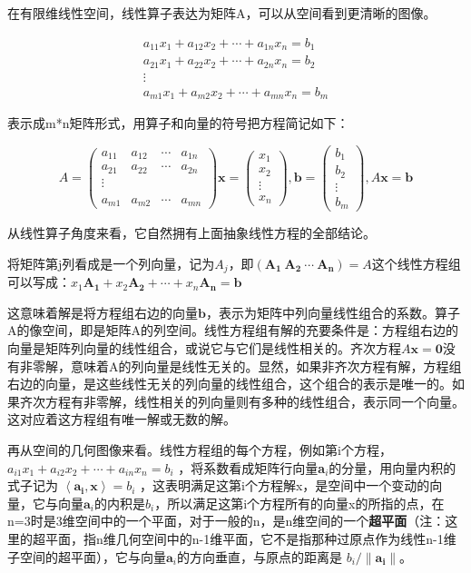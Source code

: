 在有限维线性空间，线性算子表达为矩阵A，可以从空间看到更清晰的图像。

\[\begin{matrix} a_{11}x_1+a_{12}x_2+\cdots+a_{1n}x_n=b_1 \\ a_{21}x_1+a_{22}x_2+\cdots+a_{2n}x_n=b_2 \\ \vdots\\  a_{m1}x_1+a_{m2}x_2+\cdots +a_{mn}x_n=b_m\end{matrix}\]

表示成m*n矩阵形式，用算子和向量的符号把方程简记如下：

\[A=\begin{pmatrix}a_{11}& a_{12}&\cdots& a_{1n} \\ a_{21}& a_{22}&\cdots& a_{2n} \\ \vdots\\ \\a_{m1}& a_{m2} &\cdots& a_{mn}  \end{pmatrix} \textbf{x}= \begin{pmatrix}x_1 \\x_2 \\ \vdots \\x_n \end{pmatrix},  \textbf{b}= \begin{pmatrix}b_1 \\b_2 \\ \vdots \\b_m \end{pmatrix},A\textbf{x}=\textbf{b}\]

从线性算子角度来看，它自然拥有上面抽象线性方程的全部结论。

将矩阵第j列看成是一个列向量，记为$ A_j $，即$ (\bm{A_1}\ \bm{A_2}\  \cdots \  \bm{A_n}) = A $这个线性方程组可以写成：$ x_1\bm{A_1}+x_2\bm{A_2}+\cdots+x_n\bm{A_n}=\bm{b} $

这意味着解是将方程组右边的向量$ \bm{b} $，表示为矩阵中列向量线性组合的系数。算子A的像空间，即是矩阵A的列空间。线性方程组有解的充要条件是：方程组右边的向量是矩阵列向量的线性组合，或说它与它们是线性相关的。齐次方程$ A\bm{x}=\bm{0} $没有非零解，意味着A的列向量是线性无关的。显然，如果非齐次方程有解，方程组右边的向量，是这些线性无关的列向量的线性组合，这个组合的表示是唯一的。如果齐次方程有非零解，线性相关的列向量则有多种的线性组合，表示同一个向量。这对应着这方程组有唯一解或无数的解。

再从空间的几何图像来看。线性方程组的每个方程，例如第i个方程，$ a_{i1}x_1+a_{i2}x_2+\cdots +a_{in}x_n =b_i $ ，将系数看成矩阵行向量\textbf{a}$ _i $的分量，用向量内积的式子记为 $ \left \langle \bm{a_i}, \bm{x} \right \rangle=b_i $ ，这表明满足这第i个方程解x，是空间中一个变动的向量，它与向量$ \bm{a}_i $的内积是$ b_i $，所以满足这第i个方程所有的向量x的所指的点，在n=3时是3维空间中的一个平面，对于一般的n，是n维空间的一个\textbf{超平面}（注：这里的超平面，指n维几何空间中的n-1维平面，它不是指那种过原点作为线性n-1维子空间的超平面），它与向量$ \bm{a}_i $的方向垂直，与原点的距离是 $ b_i/\|\bm{a_i}\| $。

